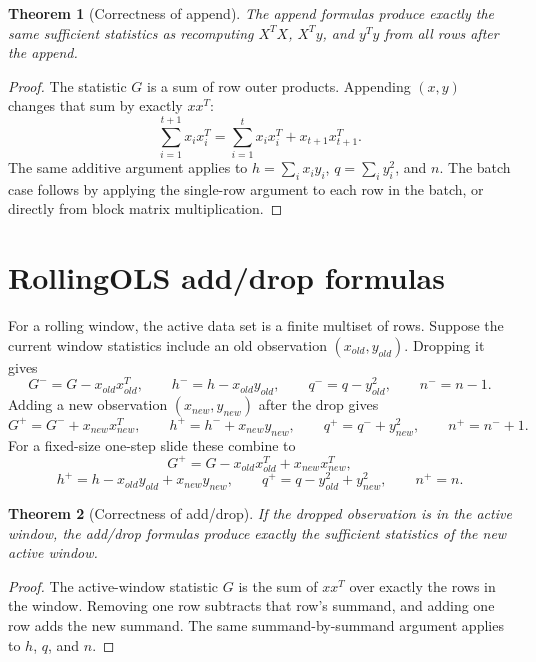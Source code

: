 \documentclass[11pt]{article}
\newtheorem{theorem}{Theorem}
\begin{document}
\begin{theorem}[Correctness of append]
The append formulas produce exactly the same sufficient statistics as
recomputing \(X^T X\), \(X^T y\), and \(y^T y\) from all rows after the
append.
\end{theorem}

\begin{proof}
The statistic \(G\) is a sum of row outer products.  Appending
\((x,y)\) changes that sum by exactly \(xx^T\):
\[
  \sum_{i=1}^{t+1} x_i x_i^T
  =
  \sum_{i=1}^{t} x_i x_i^T + x_{t+1}x_{t+1}^T .
\]
The same additive argument applies to \(h=\sum_i x_i y_i\),
\(q=\sum_i y_i^2\), and \(n\).  The batch case follows by applying the
single-row argument to each row in the batch, or directly from block
matrix multiplication.
\end{proof}

\section{RollingOLS add/drop formulas}

For a rolling window, the active data set is a finite multiset of rows.
Suppose the current window statistics include an old observation
\((x_{old}, y_{old})\).  Dropping it gives
\[
  G^- = G - x_{old}x_{old}^T,\qquad
  h^- = h - x_{old}y_{old},\qquad
  q^- = q - y_{old}^2,\qquad
  n^- = n - 1 .
\]
Adding a new observation \((x_{new}, y_{new})\) after the drop gives
\[
  G^+ = G^- + x_{new}x_{new}^T,\qquad
  h^+ = h^- + x_{new}y_{new},\qquad
  q^+ = q^- + y_{new}^2,\qquad
  n^+ = n^- + 1 .
\]
For a fixed-size one-step slide these combine to
\[
  G^+ = G - x_{old}x_{old}^T + x_{new}x_{new}^T,
\]
\[
  h^+ = h - x_{old}y_{old} + x_{new}y_{new},
  \qquad
  q^+ = q - y_{old}^2 + y_{new}^2,
  \qquad
  n^+ = n .
\]

\begin{theorem}[Correctness of add/drop]
If the dropped observation is in the active window, the add/drop
formulas produce exactly the sufficient statistics of the new active
window.
\end{theorem}

\begin{proof}
The active-window statistic \(G\) is the sum of \(xx^T\) over exactly
the rows in the window.  Removing one row subtracts that row's summand,
and adding one row adds the new summand.  The same summand-by-summand
argument applies to \(h\), \(q\), and \(n\).
\end{proof}
\end{document}
